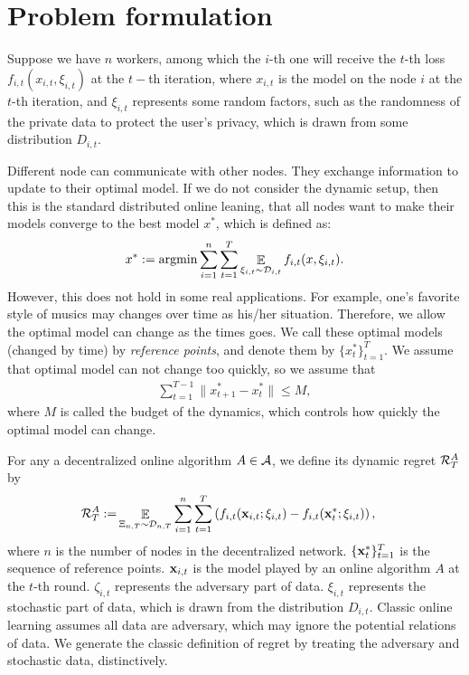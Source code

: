 \documentclass{article}
\def\rc{\color {red}}
\begin{document}
\section{Problem formulation}
{\rc
Suppose we have $n$ workers, among which the $i$-th one will receive the $t$-th loss $f_{i,t}(x_{i,t},\xi_{i,t})$ at the $t-$th iteration, where $x_{i,t}$ is the model on the node $i$ at the $t$-th iteration, and $\xi_{i,t}$ represents some random factors, such as the randomness of the private data to protect the user's privacy, which is drawn from some distribution $D_{i,t}$.

Different node can communicate with other nodes. They exchange information to update to their optimal model. If we do not consider the dynamic setup, then this is the standard distributed online leaning, that all nodes want to make their models converge to the best model $x^*$, which is defined as:
\begin{align*}
	x^*:= \argmin \sum\limits_{i=1}^n\sum\limits_{t=1}^T \EE_{\xi_{i,t} \sim \Dcal_{i,t}} f_{i,t}(x, \xi_{i,t}).
\end{align*}
However, this does not hold in some real applications. For example, one's favorite style of musics may changes over time as his/her situation. Therefore, we allow the optimal model can change as the times goes. We call these optimal models (changed by time) by \textit{reference points}, and denote them by $\{x_t^*\}_{t=1}^T$. We assume that optimal model can not change too quickly, so we assume that 
\begin{align*}
	\sum\limits_{t=1}^{T-1}\|x_{t+1}^*-x_t^*\|\le M,
\end{align*}
where $M$ is called the budget of the dynamics, which controls how quickly the optimal model can change.



}
For any a decentralized online algorithm $A \in {\mathcal{A}}$, we define its dynamic regret ${\mathcal{R}}_T^{A}$ by
\begin{align}
\label{equa_definition_our_regret}
{\mathcal{R}}_T^{A} := & \mathop{\mathbb{E}}_{ \Xi_{n,T} \sim \mathcal{D}_{n,T} }  \sum_{i=1}^n\sum_{t=1}^T \left( f_{i,t}({\bf x}_{i,t};\xi_{i,t}) - f_{i,t}({\bf x}_t^\ast;\xi_{i,t})  \right),
\end{align} where $n$ is the number of nodes in the decentralized network. $\{{\bf x}_t^\ast\}_{t=1}^T$ is the sequence of reference points. ${\bf x}_{i,t}$ is the model played by an online algorithm $A$ at the $t$-th round. $\zeta_{i,t}$ represents the adversary part of data. $\xi_{i,t}$ represents the stochastic part of data, which is drawn from the distribution $D_{i,t}$. Classic online learning assumes all data are adversary, which may ignore the potential relations of data. We generate the classic definition of regret by treating the adversary and stochastic data, distinctively.
\end{document}
